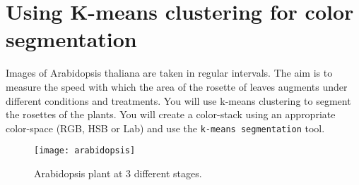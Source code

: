 \section{Using K-means clustering for color segmentation}

Images of Arabidopsis thaliana are taken in regular intervals. The aim is to measure the speed with which the area of the rosette of leaves augments under different conditions and treatments. You will use k-means clustering to segment the rosettes of the plants. You will create a color-stack using an appropriate color-space (RGB, HSB or Lab) and use the {\tt k-means segmentation} tool. 

\begin{figure}[!htb]
 \centering
 \texttt{[image: arabidopsis]}
 \caption{Arabidopsis plant at 3 different stages.}
 \label{figure:arabidopsis}
\end{figure}

